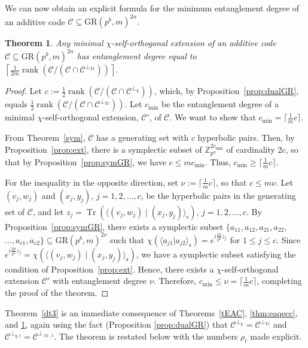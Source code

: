 \documentclass{article}
\DeclareMathOperator{\Tr}{Tr}
\DeclareMathOperator{\rank}{rank}
\newtheorem{thm}{Theorem}[section]
\theoremstyle{remark}
\theoremstyle{definition}
\numberwithin{equation}{section}
\begin{document}
We can now obtain an explicit formula for the minimum entanglement degree of an additive code $\mathcal{C} \subseteq \text{GR}(p^b,m)^{2n}.$ 

\begin{thm}\label{EAQZ} Any minimal $\chi$-self-orthogonal extension of an additive code $\mathcal{C} \subseteq \text{GR}(p^b,m)^{2n}$ has entanglement degree equal to $\left\lceil { \frac{1}{2m} \rank(\mathcal{C}/(\mathcal{C} \cap \mathcal{C}^{\perp_{{\Tr}}}))  }\right\rceil.$ 
\end{thm}
\begin{proof} 
Let $c := \frac12 \rank(\mathcal{C}/(\mathcal{C} \cap \mathcal{C}^{\perp_{{\chi}}}))  $, which, by Proposition~\ref{prop:dualGR}, equals 
$\frac{1}{2}  \rank(\mathcal{C}/(\mathcal{C} \cap \mathcal{C}^{\perp_{{\Tr}}}))  $. Let $c_{\min}$ be the entanglement degree of a minimal $\chi$-self-orthogonal extension, $\mathcal{C}'$, of $\mathcal{C}$. We want to show that $c_{\min} = \lceil \frac1m c\rceil$.

From Theorem~\ref{sym}, $\mathcal{C}$ has a generating set with $c$ hyperbolic pairs. Then, by Proposition~\ref{prop:ext}, there is a symplectic subset of $\mathbb{Z}_{p^a}^{2c_{\min}}$ of cardinality $2c$, so that by Proposition~\ref{prop:symGR}, we have $c \le mc_{\min}$. Thus, $c_{\min} \ge \lceil \frac1m c\rceil$.

For the inequality in the opposite direction, set $\nu := \lceil \frac1m c\rceil$, so that $c \le m\nu$. Let $(v_j,w_j)$ and $(x_j,y_j)$, $j = 1,2,\ldots,c$, be the hyperbolic pairs in the generating set of $\mathcal{C}$, and let $z_j = {\Tr}(\langle (v_j,w_j) \mid (x_j,y_j)\rangle_{\text{s}})$, $j=1,2,\ldots,c$. By Proposition~\ref{prop:symGR}, there exists a symplectic subset $\{a_{11},a_{12},a_{21},a_{22},$ $\ldots,a_{c1},a_{c2}\} \subseteq \text{GR}(p^b,m)^{2\nu}$ such that $ \chi(\langle a_{j1} |  a_{j2}\rangle_{\text{s}}) = e^{i \frac{2\pi }{p^b} z_j  }$ for $1\leq j \leq c$. Since $e^{i \frac{2\pi }{p^b} z_j} = \chi(\langle (v_j,w_j) \mid (x_j,y_j)\rangle_{\text{s}})$, we have a symplectic subset satisfying the condition of Proposition~\ref{prop:ext}. Hence, there exists a $\chi$-self-orthogonal extension $\mathcal{C}'$ with entanglement degree $\nu$. Therefore, $c_{\min} \le \nu = \lceil \frac1m c\rceil$, completing the proof of the theorem.
\end{proof}

Theorem~\ref{dt3} is an immediate consequence of Theorems~\ref{tEAC}, \ref{thm:eaqecc},  and \ref{EAQZ}, again using the fact (Proposition \ref{prop:dualGR}) that $\mathcal{C}^{\perp_\chi} = \mathcal{C}^{\perp_{{\Tr}}}$ and $\mathcal{C}^{\perp_{\chi,t}}=\mathcal{C}^{\perp_{\Tr,t}}$. The theorem is restated below with the numbers $\rho_t$ made explicit.
\end{document}
